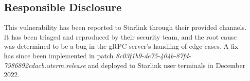 \subsection{Responsible Disclosure}\label{sec:responsible-disclosure}

This vulnerability has been reported to Starlink through their provided channels.
It has been triaged and reproduced by their security team, and the root cause was determined to be a bug in the gRPC server's handling of edge cases.
A fix has since been implemented in patch \textit{8c03f1b9-de75-404b-87fd-7986892cdacb.uterm.release} and deployed to Starlink user terminals in December 2022.
